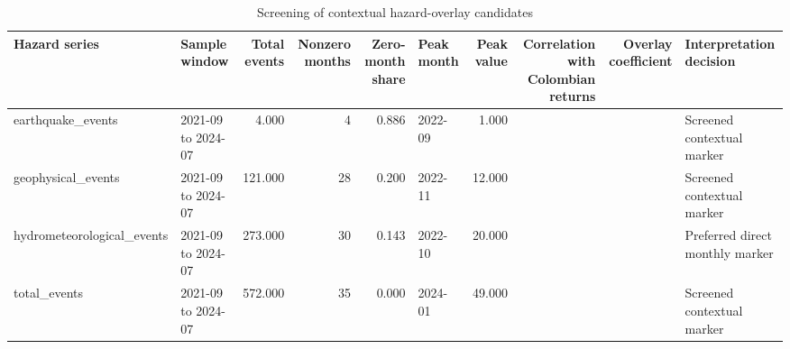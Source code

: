 \begin{table}
\caption{Screening of contextual hazard-overlay candidates}
\label{tab:hazard_screening}
\begin{tabular}{llrrrlrrrl}
\toprule
Hazard series & Sample window & Total events & Nonzero months & Zero-month share & Peak month & Peak value & Correlation with Colombian returns & Overlay coefficient & Interpretation decision \\
\midrule
earthquake_events & 2021-09 to 2024-07 & 4.000 & 4 & 0.886 & 2022-09 & 1.000 &  &  & Screened contextual marker \\
geophysical_events & 2021-09 to 2024-07 & 121.000 & 28 & 0.200 & 2022-11 & 12.000 &  &  & Screened contextual marker \\
hydrometeorological_events & 2021-09 to 2024-07 & 273.000 & 30 & 0.143 & 2022-10 & 20.000 &  &  & Preferred direct monthly marker \\
total_events & 2021-09 to 2024-07 & 572.000 & 35 & 0.000 & 2024-01 & 49.000 &  &  & Screened contextual marker \\
\bottomrule
\end{tabular}
\end{table}
